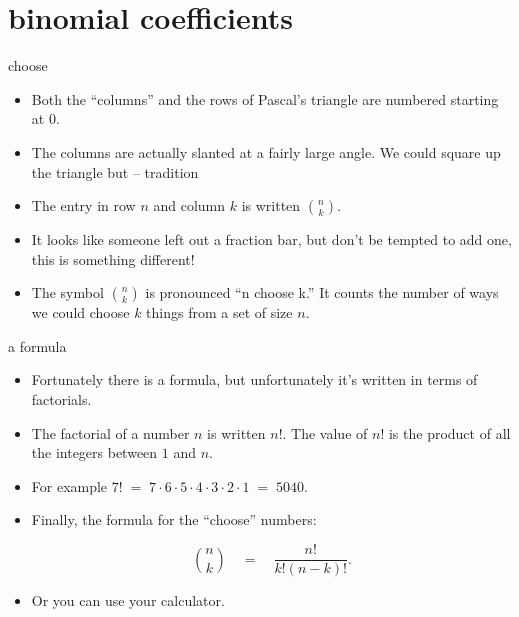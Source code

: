 \documentclass[landscape]{beamer}
\begin{document}
\section{binomial coefficients}



\begin{frame}{choose}
\begin{itemize}
\item Both the ``columns'' and the rows of Pascal's triangle are numbered starting at 0. \pause
\item The columns are actually slanted at a fairly large angle.  We could square up the triangle but -- tradition\textellipsis \pause
\item The entry in row $n$ and column $k$ is written $\displaystyle \binom{n}{k}$. \pause
\item It looks like someone left out a fraction bar, but don't be tempted to add one, this is something different! \pause
\item The symbol  $\displaystyle \binom{n}{k}$ is pronounced ``n choose k.''  It counts the number of ways we could choose $k$ things from a set of size $n$.
\end{itemize}
\end{frame}

\begin{frame}{a formula}
\begin{itemize}
\item Fortunately there is a formula, but unfortunately it's written in terms of factorials. \pause
\item The factorial of a number $n$ is written $n!$. The value of $n!$ is the product of all the integers between $1$ and $n$. \pause
\item For example $7! \; = \; 7\cdot 6 \cdot 5 \cdot 4 \cdot 3 \cdot 2 \cdot 1 \; = \; 5040$. \pause 
\item Finally, the formula for the ``choose'' numbers:

\[ \binom{n}{k} \quad = \quad \frac{n!}{k! (n-k)!}. \]
\pause 
\item Or you can use your calculator. 
\end{itemize}
\end{frame}
\end{document}
